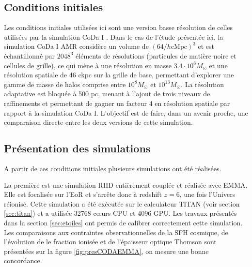 \subsection{Conditions initiales}
\label{sec:ICCODA}
Les conditions initiales utilisées ici sont une version basse résolution de celles utilisées par la simulation \ac{CoDa} I \citep{ocvirk_cosmic_2015}.
Dans le cas de l'étude présentée ici, la simulation \ac{CoDa} I AMR considère un volume de $\left( 64/h \mathrm{cMpc} \right)^3$ et est échantillonné par $2048^3$ éléments de résolutions (particules de matière noire et cellules de grille), ce qui mène à une résolution en masse $3.4 \cdot 10^6 M_\odot$ et une résolution spatiale de 46 ckpc sur la grille de base, permettant d'explorer une gamme de masse de halos comprise entre $10^8 M_\odot$ et $10^{13}M_\odot$.
La résolution adaptative est bloquée à 500 pc, menant à l'ajout de trois niveaux de raffinements et permettant de gagner un facteur 4 en résolution spatiale par rapport à la simulation  \ac{CoDa} I.
L'objectif est de faire, dans un avenir proche, une comparaison directe entre les deux versions de cette simulation. %


\subsection{Présentation des simulations}
\label{sec:presCODA}

A partir de ces conditions initiales plusieurs simulations ont été réalisées.

La première est une simulation \ac{RHD} entièrement couplée et réalisée avec EMMA.
Elle est focalisée sur l'\ac{EoR} et s’arrête donc à redshift $z=6$, une fois l'Univers réionisé.
Cette simulation a été exécutée sur le calculateur TITAN (voir section \ref{sec:titan}) et a utilisée 32768 cœurs \ac{CPU} et 4096 \ac{GPU}.
Les travaux présentés dans la section \ref{sec:etoiles} ont permis de calibrer correctement cette simulation.
Les comparaisons aux contraintes observationnelles de la \ac{SFH} cosmique, de l'évolution de le fraction ionisée et de l'épaisseur optique Thomson sont présentées sur la figure \ref{fig:presCODAEMMA}, on mesure une bonne concordance.

